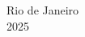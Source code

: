 \pagestyle{empty}
\begin{center}
    \large \textbf{\MakeUppercase{\instituicao}}
    \vskip 6cm
    \large \textbf{\MakeUppercase{\autor}}
    \vskip 6cm
    \Huge \textbf{\large \MakeUppercase{\tema}}
    \vfill
    \large
    Rio de Janeiro \\
    2025
\end{center}